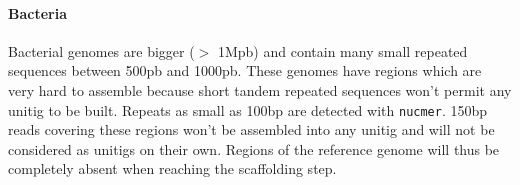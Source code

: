 \documentclass[12pt]{article}
\begin{document}
\paragraph*{Bacteria}
Bacterial genomes are bigger ($>$ 1Mpb) and contain many small repeated sequences between 500pb and 1000pb. These genomes have regions which are very hard to assemble because short tandem repeated  sequences won't permit any unitig to be built. Repeats as small as 100bp are detected with \texttt{nucmer}. 150bp reads covering these regions won't be assembled into any unitig and will not be considered as unitigs on their own. Regions of the reference genome will thus be completely absent when reaching the scaffolding step.
\begin{figure}[h!]
\begin{center}
\end{center}
\end{figure}
\end{document}
